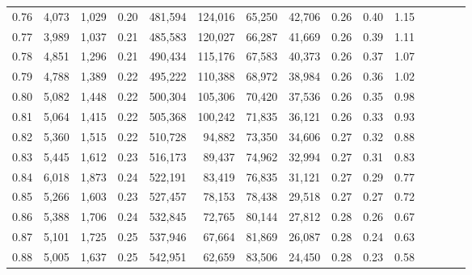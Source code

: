 \begin{tabular}{rrrcrrrrrrrrrrr}
0.76 &   4,073 &   1,029 &                                       0.20 &  481,594 &  124,016 &   65,250 &   42,706 &  0.26 &  0.40 &                         1.15 \\
0.77 &   3,989 &   1,037 &                                       0.21 &  485,583 &  120,027 &   66,287 &   41,669 &  0.26 &  0.39 &                         1.11 \\
0.78 &   4,851 &   1,296 &                                       0.21 &  490,434 &  115,176 &   67,583 &   40,373 &  0.26 &  0.37 &                         1.07 \\
0.79 &   4,788 &   1,389 &                                       0.22 &  495,222 &  110,388 &   68,972 &   38,984 &  0.26 &  0.36 &                         1.02 \\
0.80 &   5,082 &   1,448 &                                       0.22 &  500,304 &  105,306 &   70,420 &   37,536 &  0.26 &  0.35 &                         0.98 \\
0.81 &   5,064 &   1,415 &                                       0.22 &  505,368 &  100,242 &   71,835 &   36,121 &  0.26 &  0.33 &                         0.93 \\
0.82 &   5,360 &   1,515 &                                       0.22 &  510,728 &   94,882 &   73,350 &   34,606 &  0.27 &  0.32 &                         0.88 \\
0.83 &   5,445 &   1,612 &                                       0.23 &  516,173 &   89,437 &   74,962 &   32,994 &  0.27 &  0.31 &                         0.83 \\
0.84 &   6,018 &   1,873 &                                       0.24 &  522,191 &   83,419 &   76,835 &   31,121 &  0.27 &  0.29 &                         0.77 \\
0.85 &   5,266 &   1,603 &                                       0.23 &  527,457 &   78,153 &   78,438 &   29,518 &  0.27 &  0.27 &                         0.72 \\
0.86 &   5,388 &   1,706 &                                       0.24 &  532,845 &   72,765 &   80,144 &   27,812 &  0.28 &  0.26 &                         0.67 \\
0.87 &   5,101 &   1,725 &                                       0.25 &  537,946 &   67,664 &   81,869 &   26,087 &  0.28 &  0.24 &                         0.63 \\
0.88 &   5,005 &   1,637 &                                       0.25 &  542,951 &   62,659 &   83,506 &   24,450 &  0.28 &  0.23 &                         0.58 \\

\end{tabular}
